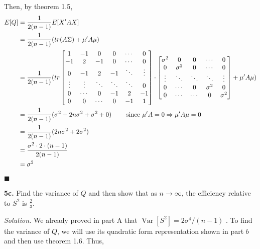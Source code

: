 \documentclass{article}
\newcommand{\Var}{\operatorname{Var}} %
\begin{document}
Then, by theorem 1.5,
\begin{align*}
 E[Q]&= \frac{1}{2(n-1)} E[X'AX] \\
 &=\frac{1}{2(n-1)}( tr(A\Sigma) + \mu'A\mu) \\
 &=\frac{1}{2(n-1)}(tr
 \begin{bmatrix}
1 & -1 & 0 & 0 & \cdots & 0 \\
-1 & 2 & -1 & 0 & \cdots&0 \\
0 & -1 & 2 & -1 & \ddots &\vdots \\
\vdots & \vdots & \ddots&\ddots &\ddots& 0\\
0&  \cdots & 0 &-1&2&-1 \\
0 & 0& \cdots & 0 & -1&1
\end{bmatrix}\cdot
\begin{bmatrix}
\sigma^2 & 0 & 0 &\cdots & 0\\
0 & \sigma^2 & 0&  \cdots&0\\
\vdots &\ddots & \ddots& \ddots&\vdots\\
0& \cdots& 0 & \sigma^2 & 0 \\
0& \cdots& \cdots & 0 &\sigma^2
\end{bmatrix} + \mu'A\mu) \\
&= \frac{1}{2(n-1)}( \sigma^2 + 2n\sigma^2+\sigma^2 + 0) \hspace{8mm} \text{since  } \mu'A= 0  \Rightarrow \mu'A\mu=0 \\
&= \frac{1}{2(n-1)}( 2n\sigma^2 + 2 \sigma^2) \\
&= \frac{\sigma^2\cdot 2\cdot(n-1)}{2(n-1)} \\
&= \sigma^2 
\end{align*}
\begin{flushright}
\(\blacksquare\) 
\end{flushright}

\newpage
\textbf{5c.} Find the variance of \(Q\) and then show that as \(n \rightarrow \infty\), the efficiency relative to \(S^2\) is \(\frac23\). 


\vspace{5mm}

\textit{Solution. } We already proved in part A that \(\Var[S^2] = 2\sigma^4 /(n-1) \) . To find the variance of \(Q\), we will use its quadratic form representation shown in part \(b\) and then use theorem 1.6. Thus, 
\end{document}
